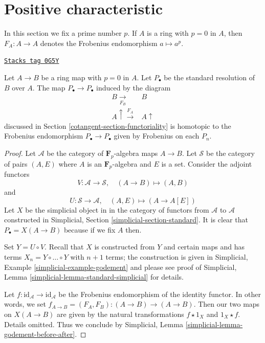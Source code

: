 \section{Positive characteristic}
\label{cotangent-section-positive-characteristic}
In this section we fix a prime number $p$.
If $A$ is a ring with $p = 0$ in $A$, then $F_A : A \to A$
denotes the Frobenius endomorphism $a \mapsto a^p$.

\begin{lemma}
\label{cotangent-lemma-frobenius-homotopy}
\href{https://stacks.math.columbia.edu/tag/0G5Y}{\texttt{Stacks tag 0G5Y}}

Let $A \to B$ be a ring map with $p = 0$ in $A$. Let $P_\bullet$ be the
standard resolution of $B$ over $A$. The map $P_\bullet \to P_\bullet$
induced by the diagram
$$
\begin{array}{cc}B \underset{F_B}{\longrightarrow} & B \\ A \uparrow\overset{F_A}{\longrightarrow} & A \uparrow\end{array}
$$
discussed in Section \ref{cotangent-section-functoriality} is homotopic to the Frobenius
endomorphism $P_\bullet \to P_\bullet$ given by Frobenius on each $P_n$.
\end{lemma}

\begin{proof}
Let $\mathcal{A}$ be the category of $\mathbf{F}_p$-algebra maps
$A \to B$. Let $\mathcal{S}$ be the category of pairs $(A, E)$
where $A$ is an $\mathbf{F}_p$-algebra and $E$ is a set. Consider the
adjoint functors
$$
V : \mathcal{A} \to \mathcal{S}, \quad (A \to B) \mapsto (A, B)
$$
and
$$
U : \mathcal{S} \to \mathcal{A}, \quad (A, E) \mapsto (A \to A[E])
$$
Let $X$ be the simplicial object in
in the category of functors from $\mathcal{A}$ to $\mathcal{A}$
constructed in Simplicial, Section \ref{simplicial-section-standard}.
It is clear that $P_\bullet = X(A \to B)$ because if we fix
$A$ then.

\medskip\noindent
Set $Y = U \circ V$. Recall that $X$ is constructed from $Y$
and certain maps and has terms $X_n = Y \circ \ldots \circ Y$
with $n + 1$ terms; the construction is given in
Simplicial, Example \ref{simplicial-example-godement} and please see
proof of Simplicial, Lemma \ref{simplicial-lemma-standard-simplicial}
for details.

\medskip\noindent
Let $f : \text{id}_\mathcal{A} \to \text{id}_\mathcal{A}$
be the Frobenius endomorphism of the identity functor.
In other words, we set $f_{A \to B} = (F_A, F_B) : (A \to B) \to (A \to B)$.
Then our two maps on $X(A \to B)$ are given by the natural transformations
$f \star 1_X$ and $1_X \star f$. Details omitted.
Thus we conclude by Simplicial, Lemma
\ref{simplicial-lemma-godement-before-after}.
\end{proof}

